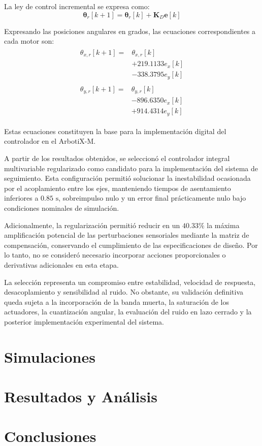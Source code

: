 \documentclass[12pt,a4paper]{article}
\begin{document}
La ley de control incremental se expresa como:
\begin{equation}
\boldsymbol{\theta}_r[k+1] = \boldsymbol{\theta}_r[k] + \mathbf{K}_D\mathbf{e}[k]
\end{equation}

Expresando las posiciones angulares en grados, las ecuaciones correspondientes a cada motor son:
\begin{align}
\boxed{
\begin{aligned}
\theta_{x,r}[k+1] ={} & \theta_{x,r}[k] \\
& + 219.1133e_x[k] \\
& - 338.3795e_y[k]
\end{aligned}
} \\
\boxed{
\begin{aligned}
\theta_{y,r}[k+1] ={} & \theta_{y,r}[k] \\
& - 896.6350e_x[k] \\
& + 914.4314e_y[k]
\end{aligned}
}
\end{align}

Estas ecuaciones constituyen la base para la implementación digital del controlador en el ArbotiX-M.

A partir de los resultados obtenidos, se seleccionó el controlador integral multivariable regularizado como candidato para la implementación del sistema de seguimiento. Esta configuración permitió solucionar la inestabilidad ocasionada por el acoplamiento entre los ejes, manteniendo tiempos de asentamiento inferiores a $0.85\text{ s}$, sobreimpulso nulo y un error final prácticamente nulo bajo condiciones nominales de simulación.

Adicionalmente, la regularización permitió reducir en un $40.33\%$ la máxima amplificación potencial de las perturbaciones sensoriales mediante la matriz de compensación, conservando el cumplimiento de las especificaciones de diseño. Por lo tanto, no se consideró necesario incorporar acciones proporcionales o derivativas adicionales en esta etapa.

La selección representa un compromiso entre estabilidad, velocidad de respuesta, desacoplamiento y sensibilidad al ruido. No obstante, su validación definitiva queda sujeta a la incorporación de la banda muerta, la saturación de los actuadores, la cuantización angular, la evaluación del ruido en lazo cerrado y la posterior implementación experimental del sistema.

\section{Simulaciones}

\section{Resultados y Análisis}

\section{Conclusiones}

\printbibliography[title={Bibliografía},heading=bibintoc]
\end{document}
